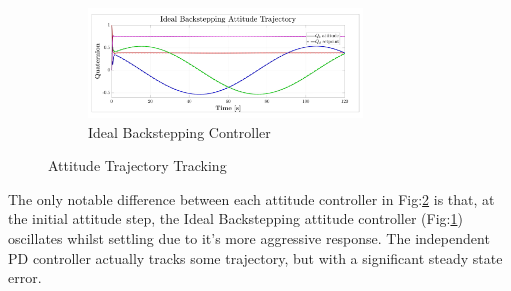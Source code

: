 \par
\begin{figure}[hbtp]\ContinuedFloat
\vspace{-6pt}
\begin{subfigure}{\textwidth}
\centering
\includegraphics[width=0.8\textwidth]{graphs/IBC_Trajectory}
\vspace{-11pt}
\caption{Ideal Backstepping Controller}
\label{fig:attitude-trajectory-ibc-tracking}
\end{subfigure}
\vspace{-8pt}
\caption{Attitude Trajectory Tracking}
\label{fig:attitude-trajectory-tracking}
\vspace{-10pt}
\end{figure}
The only notable difference between each attitude controller in Fig:\ref{fig:attitude-trajectory-tracking} is that, at the initial attitude step, the Ideal Backstepping attitude controller (Fig:\ref{fig:attitude-trajectory-ibc-tracking}) oscillates whilst settling due to it's more aggressive response. The independent PD controller actually tracks some trajectory, but with a significant steady state error.
\par
